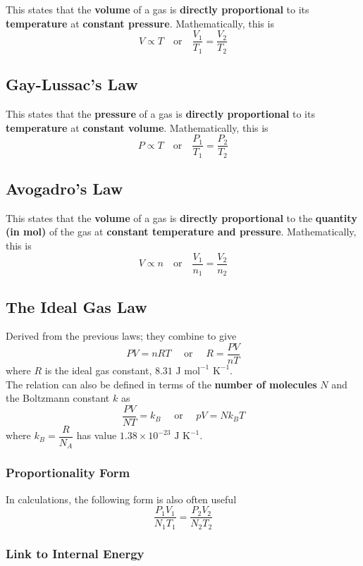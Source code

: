 \documentclass[a4paper,12pt]{article}
\newcommand{\eqor}{\quad \text{or} \quad}
\newcommand{\lb}{\\[8pt]}
\begin{document}
This states that the \textbf{volume} of a gas is \textbf{directly proportional} to its \textbf{temperature} at \textbf{constant pressure}. Mathematically, this is
$$V\propto T \eqor \frac{V_1}{T_1} = \frac{V_2}{T_2}$$

\subsection{Gay-Lussac's Law}

This states that the \textbf{pressure} of a gas is \textbf{directly proportional} to its \textbf{temperature} at \textbf{constant volume}. Mathematically, this is
$$P \propto T  \eqor \frac{P_1}{T_1} = \frac{P_2}{T_2}$$

\subsection{Avogadro's Law}

This states that the \textbf{volume} of a gas is \textbf{directly proportional} to the \textbf{quantity (in mol)} of the gas at \textbf{constant temperature and pressure}. Mathematically, this is
$$V \propto n \eqor \frac{V_1}{n_1} = \frac{V_2}{n_2}$$

\pagebreak

\subsection{The Ideal Gas Law}
Derived from the previous laws; they combine to give
$$PV = nRT \quad \text{ or } \quad R = \frac{PV}{nT}$$
where $R$ is the ideal gas constant, $8.31 \text{ J mol}^{-1} \text{ K}^{-1}$.\lb
The relation can also be defined in terms of the \textbf{number of molecules} $N$ and the Boltzmann constant $k$ as
\begin{equation}\label{eq:ideal_gas}
  \frac{PV}{NT} = k_B \quad \text{ or } \quad pV = Nk_BT
\end{equation}
where $k_B = \dfrac{R}{N_A}$ has value $1.38 \times 10^{-23} \text{ J K}^{-1}$.

\subsubsection{Proportionality Form}
In calculations, the following form is also often useful
$$\frac{P_1V_1}{N_1T_1} = \frac{P_2V_2}{N_2T_2}$$

\subsubsection{Link to Internal Energy}
\end{document}
